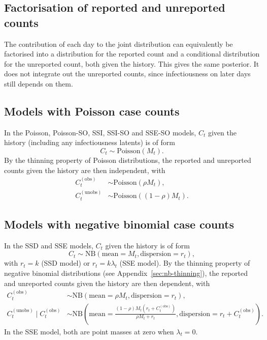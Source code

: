 \documentclass{article}
\newcommand{\PoissonDist}[1]{\mathrm{Poisson}\left(#1\right)}
\newcommand{\NBDist}[2]{\mathrm{NB}\left(\mathrm{mean}=#1,
\mathrm{dispersion}=#2\right)}
\begin{document}
\begin{appendix}
  \section{Factorisation of reported and unreported counts}
  \label{sec:factorisation}

  The contribution of each day to the joint distribution can equivalently be
  factorised into a distribution for the reported count and a conditional
  distribution for the unreported count, both given the history. This gives
  the same posterior. It does not integrate out the unreported counts, since
  infectiousness on later days still depends on them.

  \subsection{Models with Poisson case counts}

  In the Poisson, Poisson-SO, SSI, SSI-SO and SSE-SO models, \(C_t\) given
  the history (including any infectiousness latents) is of form
  \begin{equation}
    C_t \sim \PoissonDist{M_t}.
  \end{equation}
  By the thinning property of Poisson distributions, the reported and
  unreported counts given the history are then independent, with
  \begin{align}
    C_t^{(\mathrm{obs})} &\sim \PoissonDist{\rho M_t},\\
    C_t^{(\mathrm{unobs})} &\sim \PoissonDist{(1-\rho) M_t}.
  \end{align}

  \subsection{Models with negative binomial case counts}

  In the SSD and SSE models, \(C_t\) given the history is of form
  \begin{equation}
    C_t \sim \NBDist{M_t}{r_t},
  \end{equation}
  with \(r_t=k\) (SSD model) or \(r_t=k\lambda_t\) (SSE model). By the
  thinning property of negative binomial distributions (see
  Appendix~\ref{sec:nb-thinning}), the reported and unreported counts given
  the history are then dependent, with
  \begin{align}
    C_t^{(\mathrm{obs})} &\sim \NBDist{\rho M_t}{r_t},\\
    C_t^{(\mathrm{unobs})}\mid C_t^{(\mathrm{obs})} &\sim
    \NBDist{\frac{(1-\rho)M_t(r_t+C_t^{(\mathrm{obs})})}{\rho M_t
    +r_t}}{r_t+C_t^{(\mathrm{obs})}}.
  \end{align}
  In the SSE model, both are point masses at zero when \(\lambda_t=0\).


\end{appendix}
\end{document}
